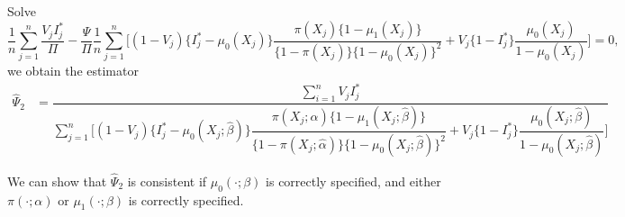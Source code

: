 \documentclass{article}
\begin{document}
Solve
$$\dfrac{1}{n}\sum_{j=1}^n \dfrac{V_jI^*_j}{\Pi}-\dfrac{\Psi}{\Pi}\dfrac{1}{n}\sum_{j=1}^n\bigg[ (1-V_j)\{I^*_j - \mu_0(X_j)\}\dfrac{\pi(X_j)\{1 - \mu_1(X_j)\}}{\{1 - \pi(X_j)\}\{1 - \mu_0(X_j)\}^2} + V_j\{1-I^*_j\}\dfrac{\mu_0(X_j)}{1-\mu_0(X_j)}\bigg]=0,$$
we obtain the estimator 
\begin{align*}
\hat\Psi_2&= \dfrac{\sum_{i=1}^n V_jI_j^*}{\sum_{j=1}^n\bigg[ (1-V_j)\{I^*_j - \mu_0(X_j;\hat\beta)\}\dfrac{\pi(X_j;\hat\alpha)\{1 - \mu_1(X_j;\hat\beta)\}}{\{1 - \pi(X_j;\hat\alpha)\}\{1 - \mu_0(X_j;\hat\beta)\}^2} + V_j\{1-I^*_j\}\dfrac{\mu_0(X_j;\hat\beta)}{1-\mu_0(X_j;\hat\beta)}\bigg]}
\end{align*}

We can show that $\hat\Psi_2$ is consistent if $\mu_0(\cdot;\beta)$ is correctly specified, and either $\pi(\cdot;\alpha)$ or $\mu_1(\cdot;\beta)$ is correctly specified. 
\end{document}
